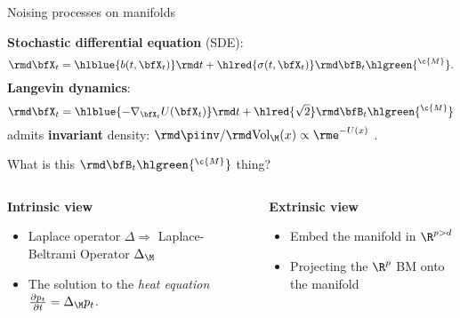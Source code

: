    
   \begin{frame}{Noising processes on manifolds}
   
   \textbf{Stochastic differential equation} (SDE):
   \begin{equation*}
     \label{eq:sde}
       \rmd \bfX_t = \hlblue{b(t, \bfX_t)} \rmd t + \hlred{\sigma(t, \bfX_t)} \rmd \bfB_t\hlgreen{^\c{M}}.
   \end{equation*}
   \pause
   \textbf{Langevin dynamics}:
   \begin{equation*}
     \label{eq:langevin}
    \rmd \bfX_t = \hlblue{-\nabla_{\bfX_t} U(\bfX_t)} \rmd t + \hlred{\sqrt{2}} \rmd \bfB_t\hlgreen{^\c{M}}
   \end{equation*}
   admits \textbf{invariant} density: $\rmd \piinv/ \rmd \textrm{Vol}_\M(x) \propto \rme^{-U(x)}$ \parencite[Section 2.4]{durmus2016high}.
   \pause
   
   What is this $\rmd \bfB_t\hlgreen{^\c{M}}$ thing?
   \vspace{-0.5em}
   \begin{columns}
   \begin{column}{0.5\textwidth}
       \begin{center}
          \textbf{Intrinsic view}
       \end{center}
       \vspace{-0.7em}
      \begin{itemize}
          \item Laplace operator $\Delta \Rightarrow$ Laplace-Beltrami Operator $\Delta_\M$
          \item The solution to the \textit{heat equation} $\tfrac{\partial p_t}{\partial t} = \Delta_\M p_t$.
      \end{itemize}
   \end{column}
   \pause
   \begin{column}{0.5\textwidth}  %
       \begin{center}
           \textbf{Extrinsic view}
       \end{center}
       \vspace{-0.7em}
       \begin{itemize}
           \item Embed the manifold in $\R^{p>d}$
           \item Projecting the $\R^p$ BM onto the manifold
       \end{itemize}
   \end{column}
   \end{columns}
   
   
   \end{frame}
   

